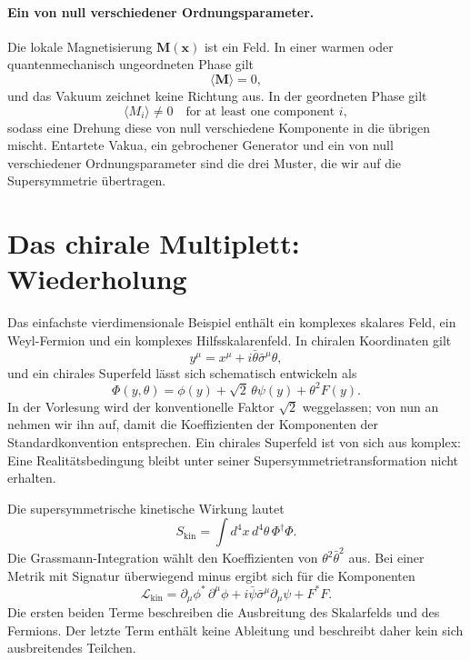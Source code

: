 \paragraph{Ein von null verschiedener Ordnungsparameter.}
Die lokale Magnetisierung \(\mathbf M(\mathbf x)\) ist ein Feld. In einer warmen oder quantenmechanisch ungeordneten Phase gilt
\begin{equation}
\langle\mathbf M\rangle=0,
\end{equation}
und das Vakuum zeichnet keine Richtung aus. In der geordneten Phase gilt
\begin{equation}
\langle M_i\rangle\neq0
\quad\text{for at least one component }i,
\label{eq:l9-magnetization-order}
\end{equation}
sodass eine Drehung diese von null verschiedene Komponente in die übrigen mischt. Entartete Vakua, ein gebrochener Generator und ein von null verschiedener Ordnungsparameter sind die drei Muster, die wir auf die Supersymmetrie übertragen.

\section{Das chirale Multiplett: Wiederholung}

Das einfachste vierdimensionale Beispiel enthält ein komplexes skalares Feld, ein Weyl-Fermion und ein komplexes Hilfsskalarenfeld. In chiralen Koordinaten gilt
\begin{equation}
y^\mu=x^\mu+i\bar\theta\bar\sigma^\mu\theta,
\end{equation}
und ein chirales Superfeld lässt sich schematisch entwickeln als
\begin{equation}
\Phi(y,\theta)=
\phi(y)+\sqrt2\,\theta\psi(y)+\theta^2F(y).
\label{eq:l9-chiral-expansion}
\end{equation}
In der Vorlesung wird der konventionelle Faktor \(\sqrt2\) weggelassen; von nun an nehmen wir ihn auf, damit die Koeffizienten der Komponenten der Standardkonvention entsprechen. Ein chirales Superfeld ist von sich aus komplex: Eine Realitätsbedingung bleibt unter seiner Supersymmetrietransformation nicht erhalten.

Die supersymmetrische kinetische Wirkung lautet
\begin{equation}
S_{\mathrm{kin}}
=
\int d^4x\,d^4\theta\,
\Phi^\dagger\Phi.
\label{eq:l9-kahler-action}
\end{equation}
Die Grassmann-Integration wählt den Koeffizienten von
\(\theta^2\bar\theta^2\) aus. Bei einer Metrik mit Signatur überwiegend minus ergibt sich für die Komponenten
\begin{equation}
\mathcal L_{\mathrm{kin}}
=
\partial_\mu\phi^\ast\,\partial^\mu\phi
+i\bar\psi\bar\sigma^\mu\partial_\mu\psi
+F^\ast F.
\label{eq:l9-chiral-kinetic}
\end{equation}
Die ersten beiden Terme beschreiben die Ausbreitung des Skalarfelds und des Fermions. Der letzte Term enthält keine Ableitung und beschreibt daher kein sich ausbreitendes Teilchen.

